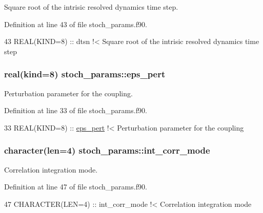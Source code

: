 Square root of the intrisic resolved dynamics time step. 



Definition at line 43 of file stoch\+\_\+params.\+f90.


\begin{DoxyCode}
43   \textcolor{keywordtype}{REAL(KIND=8)} :: dtsn\textcolor{comment}{               !< Square root of the intrisic resolved dynamics time step}
\end{DoxyCode}
\subsubsection[{\texorpdfstring{eps\+\_\+pert}{eps_pert}}]{\setlength{\rightskip}{0pt plus 5cm}real(kind=8) stoch\+\_\+params\+::eps\+\_\+pert}\hypertarget{namespacestoch__params_aa0504e89179fe42b3f3206811f1592dc}{}\label{namespacestoch__params_aa0504e89179fe42b3f3206811f1592dc}


Perturbation parameter for the coupling. 



Definition at line 33 of file stoch\+\_\+params.\+f90.


\begin{DoxyCode}
33   \textcolor{keywordtype}{REAL(KIND=8)} :: \hyperlink{namespacestoch__params_aa0504e89179fe42b3f3206811f1592dc}{eps\_pert}\textcolor{comment}{           !< Perturbation parameter for the coupling}
\end{DoxyCode}
\subsubsection[{\texorpdfstring{int\+\_\+corr\+\_\+mode}{int_corr_mode}}]{\setlength{\rightskip}{0pt plus 5cm}character(len=4) stoch\+\_\+params\+::int\+\_\+corr\+\_\+mode}\hypertarget{namespacestoch__params_ab901db3992a4df88db5a67fdd7be6ac6}{}\label{namespacestoch__params_ab901db3992a4df88db5a67fdd7be6ac6}


Correlation integration mode. 



Definition at line 47 of file stoch\+\_\+params.\+f90.


\begin{DoxyCode}
47   \textcolor{keywordtype}{CHARACTER(LEN=4)} :: int\_corr\_mode\textcolor{comment}{  !< Correlation integration mode}
\end{DoxyCode}
